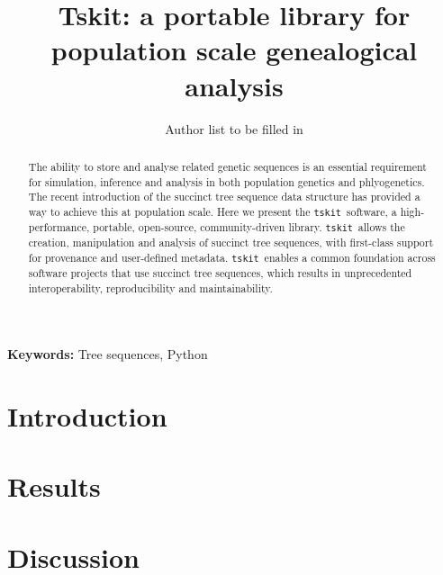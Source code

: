\documentclass{article}
\newcommand{\tskit}[0]{\texttt{tskit}}
\begin{document}
\title{Tskit: a portable library for population scale genealogical analysis}
\author{Author list to be filled in
}




\maketitle

\begin{abstract}
The ability to store and analyse related genetic sequences is an
essential requirement for simulation, inference and analysis in both
population genetics and phlyogenetics. The recent introduction of the
succinct tree sequence data structure has provided a way to achieve
this at population scale. Here we present the \tskit\ software,
a high-performance, portable, open-source, community-driven library.
\tskit\ allows the creation, manipulation and analysis of succinct tree
sequences, with first-class support for provenance and user-defined metadata.
\tskit\ enables a common foundation across software projects that use
succinct tree sequences, which results in unprecedented interoperability,
reproducibility and maintainability.
\end{abstract}


\textbf{Keywords:} Tree sequences, Python

\section*{Introduction}

\citep{kelleher2018efficient}

\section*{Results}


\section*{Discussion}
\end{document}
